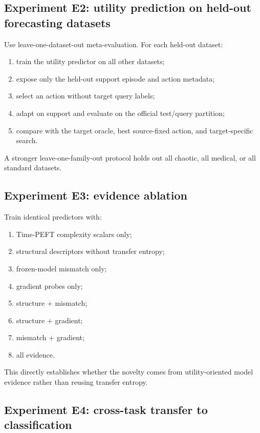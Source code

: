 \documentclass[10pt]{article}
\begin{document}
\subsection{Experiment E2: utility prediction on held-out forecasting datasets}

Use leave-one-dataset-out meta-evaluation. For each held-out dataset:
\begin{enumerate}[leftmargin=*, itemsep=1pt]
    \item train the utility predictor on all other datasets;
    \item expose only the held-out support episode and action metadata;
    \item select an action without target query labels;
    \item adapt on support and evaluate on the official test/query partition;
    \item compare with the target oracle, best source-fixed action, and target-specific search.
\end{enumerate}

A stronger leave-one-family-out protocol holds out all chaotic, all medical, or all standard datasets.

\subsection{Experiment E3: evidence ablation}

Train identical predictors with:
\begin{enumerate}[leftmargin=*, itemsep=1pt]
    \item Time-PEFT complexity scalars only;
    \item structural descriptors without transfer entropy;
    \item frozen-model mismatch only;
    \item gradient probes only;
    \item structure + mismatch;
    \item structure + gradient;
    \item mismatch + gradient;
    \item all evidence.
\end{enumerate}

This directly establishes whether the novelty comes from utility-oriented model evidence rather than reusing transfer entropy.

\subsection{Experiment E4: cross-task transfer to classification}
\end{document}
